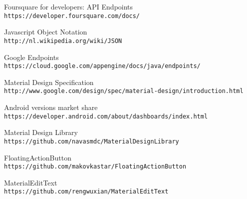\begin{thebibliography}{9}


Foursquare for developers: API Endpoints
\\\texttt{https://developer.foursquare.com/docs/}

Javascript Object Notation
\\\texttt{http://nl.wikipedia.org/wiki/JSON}

Google Endpoints
\\\texttt{https://cloud.google.com/appengine/docs/java/endpoints/}

Material Design Specification
\\\texttt{http://www.google.com/design/spec/material-design/introduction.html}

Android versions market share
\\\texttt{https://developer.android.com/about/dashboards/index.html}

Material Design Library
\\\texttt{https://github.com/navasmdc/MaterialDesignLibrary}

FloatingActionButton
\\\texttt{https://github.com/makovkastar/FloatingActionButton}

MaterialEditText
\\\texttt{https://github.com/rengwuxian/MaterialEditText}

\end{thebibliography}





